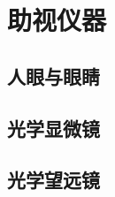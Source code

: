 

\section{助视仪器}\label{24-3}

\subsection{人眼与眼睛}\label{24-3-1}

\subsection{光学显微镜}\label{24-3-2}

\subsection{光学望远镜}\label{24-3-3}